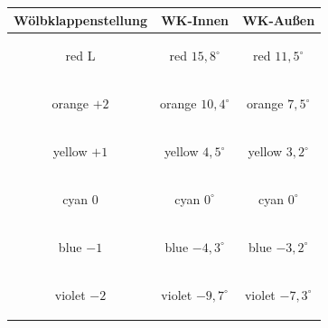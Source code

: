 \begin{center}
\begin{tabular}{|c|c|c|}
\hline
Wölbklappenstellung & WK-Innen & WK-Außen\\
\hline
\begin{color}{red} L \end{color} & \begin{color}{red} $15,8^{\circ}$ \end{color} & \begin{color}{red} $11,5^{\circ}$ \end{color}\\
\hline
\begin{color}{orange} $+2$ \end{color} & \begin{color}{orange} $10,4^{\circ}$ \end{color} & \begin{color}{orange} $7,5^{\circ}$ \end{color}\\
\hline
\begin{color}{yellow} $+1$ \end{color} & \begin{color}{yellow} $4,5^{\circ}$ \end{color} & \begin{color}{yellow} $3,2^{\circ}$ \end{color}\\
\hline
\begin{color}{cyan} $0$ \end{color} & \begin{color}{cyan} $0^{\circ}$ \end{color} & \begin{color}{cyan} $0^{\circ}$ \end{color}\\
\hline
\begin{color}{blue} $-1$ \end{color} & \begin{color}{blue} $-4,3^{\circ}$ \end{color} & \begin{color}{blue} $-3,2^{\circ}$ \end{color}\\
\hline
\begin{color}{violet} $-2$ \end{color} & \begin{color}{violet} $-9,7^{\circ}$ \end{color} & \begin{color}{violet} $-7,3^{\circ}$ \end{color}\\
\hline

\end{tabular}
\end{center}
